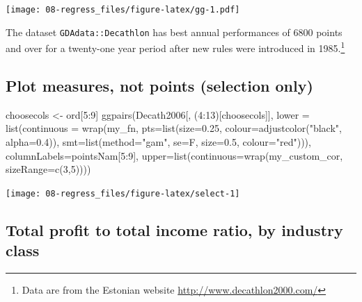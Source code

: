 \documentclass[
  10pt,
  b5paper]{book}
\newenvironment{Shaded}{\begin{snugshade}}{\end{snugshade}}
\newcommand{\AttributeTok}[1]{\textcolor[rgb]{0.77,0.63,0.00}{#1}}
\newcommand{\DecValTok}[1]{\textcolor[rgb]{0.00,0.00,0.81}{#1}}
\newcommand{\FloatTok}[1]{\textcolor[rgb]{0.00,0.00,0.81}{#1}}
\newcommand{\FunctionTok}[1]{\textcolor[rgb]{0.00,0.00,0.00}{#1}}
\newcommand{\NormalTok}[1]{#1}
\newcommand{\OtherTok}[1]{\textcolor[rgb]{0.56,0.35,0.01}{#1}}
\newcommand{\SpecialCharTok}[1]{\textcolor[rgb]{0.00,0.00,0.00}{#1}}
\newcommand{\StringTok}[1]{\textcolor[rgb]{0.31,0.60,0.02}{#1}}
\begin{document}
\texttt{[image: 08-regress\_files/figure-latex/gg-1.pdf]}

The dataset \texttt{GDAdata::Decathlon} has best annual performances of 6800 points and over for a twenty-one year period after new rules were introduced in
1985.\footnote{Data are from the Estonian website \url{http://www.decathlon2000.com/}}

\hypertarget{plot-measures-not-points-selection-only}{%
\subsection*{Plot measures, not points (selection only)}\label{plot-measures-not-points-selection-only}}

\begin{Shaded}
\begin{Highlighting}[]
\NormalTok{choosecols }\OtherTok{\textless{}{-}}\NormalTok{ ord[}\DecValTok{5}\SpecialCharTok{:}\DecValTok{9}\NormalTok{]}
\FunctionTok{ggpairs}\NormalTok{(Decath2006[, (}\DecValTok{4}\SpecialCharTok{:}\DecValTok{13}\NormalTok{)[choosecols]],}
        \AttributeTok{lower =} \FunctionTok{list}\NormalTok{(}\AttributeTok{continuous =} 
                       \FunctionTok{wrap}\NormalTok{(my\_fn,}
                            \AttributeTok{pts=}\FunctionTok{list}\NormalTok{(}\AttributeTok{size=}\FloatTok{0.25}\NormalTok{, }\AttributeTok{colour=}\FunctionTok{adjustcolor}\NormalTok{(}\StringTok{"black"}\NormalTok{, }\AttributeTok{alpha=}\FloatTok{0.4}\NormalTok{)), }
                            \AttributeTok{smt=}\FunctionTok{list}\NormalTok{(}\AttributeTok{method=}\StringTok{"gam"}\NormalTok{, }\AttributeTok{se=}\NormalTok{F, }\AttributeTok{size=}\FloatTok{0.5}\NormalTok{, }\AttributeTok{colour=}\StringTok{"red"}\NormalTok{))),}
        \AttributeTok{columnLabels=}\NormalTok{pointsNam[}\DecValTok{5}\SpecialCharTok{:}\DecValTok{9}\NormalTok{],}
        \AttributeTok{upper=}\FunctionTok{list}\NormalTok{(}\AttributeTok{continuous=}\FunctionTok{wrap}\NormalTok{(my\_custom\_cor, }\AttributeTok{sizeRange=}\FunctionTok{c}\NormalTok{(}\DecValTok{3}\NormalTok{,}\DecValTok{5}\NormalTok{))))}
\end{Highlighting}
\end{Shaded}

\texttt{[image: 08-regress\_files/figure-latex/select-1]}

\hypertarget{total-profit-to-total-income-ratio-by-industry-class}{%
\subsection*{Total profit to total income ratio, by industry class}\label{total-profit-to-total-income-ratio-by-industry-class}}
\end{document}
